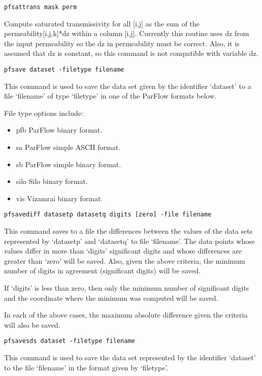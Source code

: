 \begin{description}
\item{\begin{verbatim}pfsattrans mask perm\end{verbatim}}
Compute saturated transmissivity for all [i,j] as the sum of the
permeability[i,j,k]*dz within a column [i,j]. Currently this routine
uses dz from the input permeability so the dz in permeability must be correct.
Also, it is assumed that dz is constant, so this command is not compatible with variable dz.


\item{\begin{verbatim}pfsave dataset -filetype filename\end{verbatim}}
This command is used to save the data set given by the identifier
`dataset' to a file `filename' of type `filetype' in one of the
ParFlow formats below.

File type options include:
\begin{itemize}
\item{pfb}  ParFlow binary format.
\item{sa}  ParFlow simple ASCII format.
\item{sb}  ParFlow simple binary format.
\item{silo} Silo binary format.
\item{vis}  Vizamrai binary format.
\end{itemize}

\item{\begin{verbatim}pfsavediff datasetp datasetq digits [zero] -file filename
\end{verbatim}}
This command saves to a file the differences between the values
of the data sets represented by `datasetp' and `datasetq' to file
`filename'.  The data points whose values differ in more than
`digits' significant digits and whose differences are greater than
`zero' will be saved.  Also, given the above criteria, the
minimum number of digits in agreement (significant digits) will be
saved.

If `digits' is less than zero, then only the minimum number of
significant digits and the coordinate where the minimum was
computed will be saved.

In each of the above cases, the maximum absolute difference given
the criteria will also be saved.


\item{\begin{verbatim}pfsavesds dataset -filetype filename\end{verbatim}}
This command is used to save the data set represented by the
identifier `dataset' to the file `filename' in the format given by
`filetype'.


\end{description}
